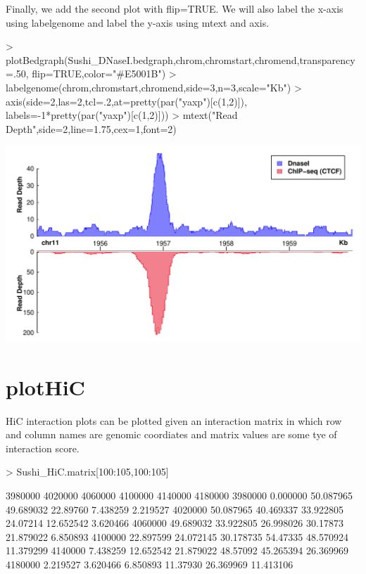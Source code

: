 \documentclass{article}
\begin{document}
Finally, we add the second plot with flip=TRUE.  We will also label the x-axis using labelgenome and label the y-axis using mtext and axis.

\begin{center}
\begin{Schunk}
\begin{Sinput}
> plotBedgraph(Sushi_DNaseI.bedgraph,chrom,chromstart,chromend,transparency=.50,
              flip=TRUE,color="#E5001B")
> labelgenome(chrom,chromstart,chromend,side=3,n=3,scale="Kb")
> axis(side=2,las=2,tcl=.2,at=pretty(par("yaxp")[c(1,2)]),
              labels=-1*pretty(par("yaxp")[c(1,2)]))
> mtext("Read Depth",side=2,line=1.75,cex=1,font=2)
\end{Sinput}
\end{Schunk}
\end{center}


\begin{center}
\includegraphics{Sushi-017}
\end{center}


\section{plotHiC}

HiC interaction plots can be plotted given an interaction matrix in which row and column names are genomic coordiates and matrix values are some tye of interaction score.

\begin{Schunk}
\begin{Sinput}
>   Sushi_HiC.matrix[100:105,100:105]
\end{Sinput}
\begin{Soutput}
          3980000   4020000   4060000  4100000   4140000   4180000
3980000  0.000000 50.087965 49.689032 22.89760  7.438259  2.219527
4020000 50.087965 40.469337 33.922805 24.07214 12.652542  3.620466
4060000 49.689032 33.922805 26.998026 30.17873 21.879022  6.850893
4100000 22.897599 24.072145 30.178735 54.47335 48.570924 11.379299
4140000  7.438259 12.652542 21.879022 48.57092 45.265394 26.369969
4180000  2.219527  3.620466  6.850893 11.37930 26.369969 11.413106
\end{Soutput}
\end{Schunk}
\end{document}
